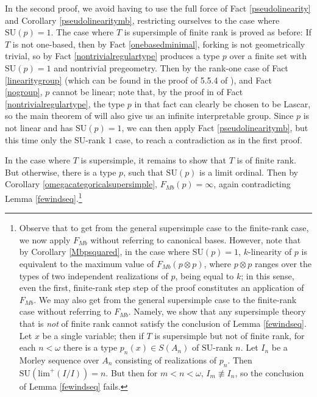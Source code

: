 \documentclass[11pt]{amsart}
\theoremstyle{definition}
\theoremstyle{remark}
\numberwithin{equation}{section}
\begin{document}
In the second proof, we avoid having to use the full force of Fact \ref{pseudolinearity} and Corollary \ref{pseudolinearitymb}, restricting ourselves to the case where $\mathrm{SU}(p)=1$. The case where $T$ is supersimple of finite rank is proved as before: If $T$ is not one-based, then by Fact \ref{onebasedminimal}, forking is not geometrically trivial, so by Fact \ref{nontrivialregulartype} produces a type $p$ over a finite set with $\mathrm{SU}(p) = 1$ and nontrivial pregeometry. Then by the rank-one case of Fact \ref{linearitygroup} (which can be found in the proof of 5.5.4 of \cite{TW03}), and Fact \ref{nogroup}, $p$ cannot be linear; note that, by the proof in \cite{Kop17} of Fact \ref{nontrivialregulartype}, the type $p$ in that fact can clearly be chosen to be Lascar, so the main theorem of \cite{DPK03} will also give us an infinite interpretable group. Since $p$ is not linear and has $\mathrm{SU}(p)=1$, we can then apply Fact \ref{pseudolinearitymb}, but this time only the $\mathrm{SU}$-rank $1$ case, to reach a contradiction as in the first proof.


In the case where $T$ is supersimple, it remains to show that $T$ is of finite rank. But otherwise, there is a type $p$, such that $\mathrm{SU}(p)$ is a limit ordinal. Then by Corollary \ref{omegacategoricalsupersimple}, $F_{Mb}(p) = \infty$, again contradicting Lemma \ref{fewindseq}.\footnote{Observe that to get from the general supersimple case to the finite-rank case, we now apply $F_{Mb}$ without referring to canonical bases. However, note that by Corollary \ref{Mbpsquared}, in the case where $\mathrm{SU}(p) = 1$, $k$-linearity of $p$ is equivalent to the maximum value of $F_{Mb}(p \otimes p)$, where $p \otimes p$ ranges over the types of two independent realizations of $p$, being equal to $k$; in this sense, even the first, finite-rank step step of the proof constitutes an application of $F_{Mb}$. We may also get from the general supersimple case to the finite-rank case without referring to $F_{Mb}$. Namely, we show that any supersimple theory that is \textit{not} of finite rank cannot satisfy the conclusion of Lemma \ref{fewindseq}. Let $x$ be a single variable; then if $T$ is supersimple but not of finite rank, for each $n < \omega$ there is a type $p_{n}(x) \in S(A_{n})$ of $\mathrm{SU}$-rank $n$. Let $I_{n}$ be a Morley sequence over $A_{n}$ consisting of realizations of $p_{n}$. Then $\mathrm{SU}(\mathrm{lim}^{+}(I/I)) = n$. But then for $m < n < \omega$, $I_{m} \not \equiv I_{n}$, so the conclusion of Lemma \ref{fewindseq} fails.} 
\end{document}
